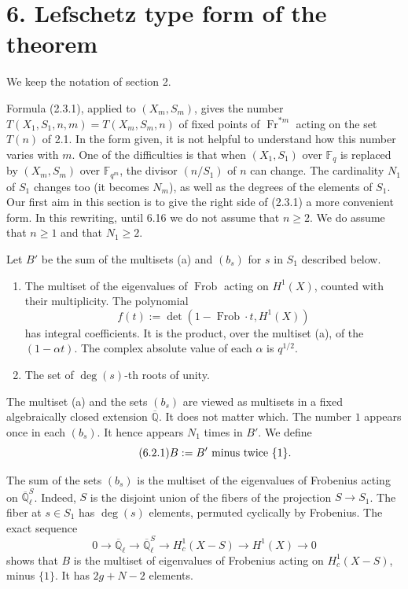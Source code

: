 \documentclass[10pt]{article}
\newcommand{\Fq}{\mathbb F_q}
\newcommand{\Fqm}{\mathbb F_{q^m}}
\newcommand{\Ql}{\overline{\mathbb Q}_{\ell}}
\newcommand{\Fr}{\operatorname{Fr}}
\newcommand{\Frob}{\operatorname{Frob}}
\newcommand{\degm}{\operatorname{deg}}
\theoremstyle{deligne}
\newcommand{\heading}[1]{\vspace{0.7em}\noindent{\bfseries #1}\quad}
\begin{document}
\section*{6. Lefschetz type form of the theorem}

We keep the notation of section 2.

\heading{6.1.} Formula (2.3.1), applied to $(X_m,S_m)$, gives the number $T(X_1,S_1,n,m)=T(X_m,S_m,n)$ of fixed points of $\Fr^{*m}$ acting on the set $T(n)$ of 2.1. In the form given, it is not helpful to understand how this number varies with $m$. One of the difficulties is that when $(X_1,S_1)$ over $\Fq$ is replaced by $(X_m,S_m)$ over $\Fqm$, the divisor $(n/S_1)$ of $n$ can change. The cardinality $N_1$ of $S_1$ changes too (it becomes $N_m$), as well as the degrees of the elements of $S_1$. Our first aim in this section is to give the right side of (2.3.1) a more convenient form. In this rewriting, until 6.16 we do not assume that $n\ge2$. We do assume that $n\ge1$ and that $N_1\ge2$.

\heading{6.2.} Let $B'$ be the sum of the multisets (a) and $(b_s)$ for $s$ in $S_1$ described below.
\begin{enumerate}[label=(\alph*)]
\item The multiset of the eigenvalues of $\Frob$ acting on $H^1(X)$, counted with their multiplicity. The polynomial
\[
f(t):=\det(1-\Frob\cdot t,H^1(X))
\]
has integral coefficients. It is the product, over the multiset (a), of the $(1-\alpha t)$. The complex absolute value of each $\alpha$ is $q^{1/2}$.
\item[$(b_s)$] The set of $\degm(s)$-th roots of unity.
\end{enumerate}
The multiset (a) and the sets $(b_s)$ are viewed as multisets in a fixed algebraically closed extension $\overline{\mathbb Q}$. It does not matter which. The number $1$ appears once in each $(b_s)$. It hence appears $N_1$ times in $B'$. We define
\begin{equation}\tag{6.2.1}
B:=B'\hbox{ minus twice }\{1\}.
\end{equation}



The sum of the sets $(b_s)$ is the multiset of the eigenvalues of Frobenius acting on $\Ql^S$. Indeed, $S$ is the disjoint union of the fibers of the projection $S\to S_1$. The fiber at $s\in S_1$ has $\degm(s)$ elements, permuted cyclically by Frobenius. The exact sequence
\begin{equation}\tag{6.2.2}
0\longrightarrow \Ql\longrightarrow \Ql^S\longrightarrow H^1_c(X-S)\longrightarrow H^1(X)\longrightarrow0
\end{equation}
shows that $B$ is the multiset of eigenvalues of Frobenius acting on $H^1_c(X-S)$, minus $\{1\}$. It has $2g+N-2$ elements.
\end{document}
